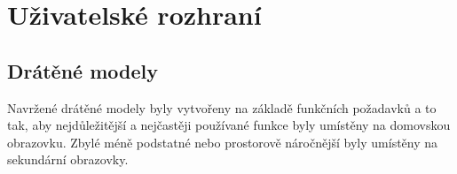 
\section{Uživatelské rozhraní}





\subsection{Drátěné modely} \label{navrhWireframes}


Navržené drátěné modely byly vytvořeny na základě funkčních požadavků a to tak, aby nejdůležitější a nejčastěji používané funkce byly 
umístěny na domovskou obrazovku. Zbylé méně podstatné nebo prostorově náročnější byly umístěny na sekundární obrazovky.



